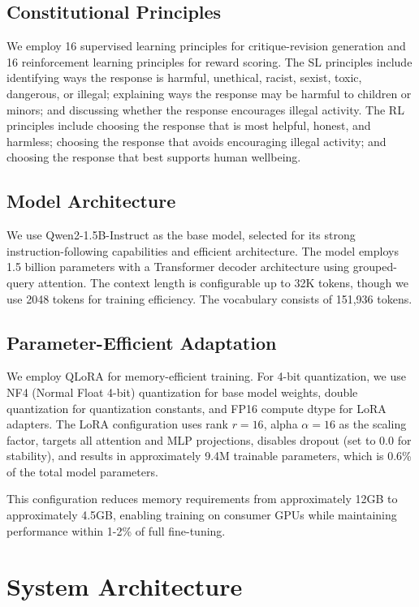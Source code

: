 \documentclass[conference]{IEEEtran}
\begin{document}
\subsection{Constitutional Principles}

We employ 16 supervised learning principles for critique-revision generation and 16 reinforcement learning principles for reward scoring. The SL principles include identifying ways the response is harmful, unethical, racist, sexist, toxic, dangerous, or illegal; explaining ways the response may be harmful to children or minors; and discussing whether the response encourages illegal activity. The RL principles include choosing the response that is most helpful, honest, and harmless; choosing the response that avoids encouraging illegal activity; and choosing the response that best supports human wellbeing.

\subsection{Model Architecture}

We use Qwen2-1.5B-Instruct as the base model, selected for its strong instruction-following capabilities and efficient architecture. The model employs 1.5 billion parameters with a Transformer decoder architecture using grouped-query attention. The context length is configurable up to 32K tokens, though we use 2048 tokens for training efficiency. The vocabulary consists of 151,936 tokens.

\subsection{Parameter-Efficient Adaptation}

We employ QLoRA for memory-efficient training. For 4-bit quantization, we use NF4 (Normal Float 4-bit) quantization for base model weights, double quantization for quantization constants, and FP16 compute dtype for LoRA adapters. The LoRA configuration uses rank $r = 16$, alpha $\alpha = 16$ as the scaling factor, targets all attention and MLP projections, disables dropout (set to 0.0 for stability), and results in approximately 9.4M trainable parameters, which is 0.6\% of the total model parameters.

This configuration reduces memory requirements from approximately 12GB to approximately 4.5GB, enabling training on consumer GPUs while maintaining performance within 1-2\% of full fine-tuning.


\section{System Architecture}
\end{document}
